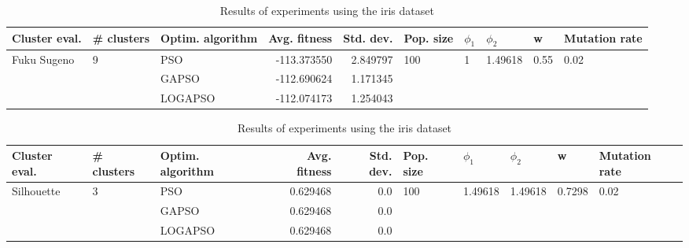 \documentclass{article}
\begin{document}
\begin{table}
\centering
\caption{Results of experiments using the iris dataset}
\begin{tabular}{lllrrlllll}
\toprule
               Cluster eval. &        \# clusters & Optim. algorithm &  Avg. fitness &  Std. dev. &            Pop. size &         $\phi_{1}$ &               $\phi_{2}$ &                     w &         Mutation rate \\
\midrule
\multirow{3}{*}{Fuku Sugeno} & \multirow{3}{*}{9} &              PSO &   -113.373550 &   2.849797 & \multirow{3}{*}{100} & \multirow{3}{*}{1} & \multirow{3}{*}{1.49618} & \multirow{3}{*}{0.55} & \multirow{3}{*}{0.02} \\
                             &                    &            GAPSO &   -112.690624 &   1.171345 &                      &                    &                          &                       &                       \\
                             &                    &          LOGAPSO &   -112.074173 &   1.254043 &                      &                    &                          &                       &                       \\
\bottomrule
\end{tabular}
\end{table}
\begin{table}
\centering
\caption{Results of experiments using the iris dataset}
\begin{tabular}{lllrrlllll}
\toprule
              Cluster eval. &        \# clusters & Optim. algorithm &  Avg. fitness &  Std. dev. &            Pop. size &               $\phi_{1}$ &               $\phi_{2}$ &                       w &         Mutation rate \\
\midrule
\multirow{3}{*}{Silhouette} & \multirow{3}{*}{3} &              PSO &      0.629468 &        0.0 & \multirow{3}{*}{100} & \multirow{3}{*}{1.49618} & \multirow{3}{*}{1.49618} & \multirow{3}{*}{0.7298} & \multirow{3}{*}{0.02} \\
                            &                    &            GAPSO &      0.629468 &        0.0 &                      &                          &                          &                         &                       \\
                            &                    &          LOGAPSO &      0.629468 &        0.0 &                      &                          &                          &                         &                       \\
\bottomrule
\end{tabular}
\end{table}
\end{document}
